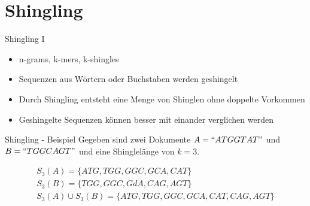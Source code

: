 \section{Shingling}

\begin{frame}{Shingling I}
    \begin{itemize}
        \item n-grams, k-mers, k-shingles
        \item Sequenzen aus Wörtern oder Buchstaben werden geshingelt
        \item Durch Shingling entsteht eine Menge von Shinglen ohne doppelte Vorkommen
        \item Geshingelte Sequenzen können besser mit einander verglichen werden
    \end{itemize}
\end{frame}


\begin{frame}{Shingling - Beispiel}
    Gegeben sind zwei Dokumente $ A = ``ATGGTAT" $ und $ B = ``TGGCAGT" $ und eine Shinglelänge von $ k = 3 $.
    
    \begin{example}
        \begin{equation*}
            \begin{split}
                S_3(A) = \{ATG, TGG, GGC, GCA, CAT\} \\
                S_3(B) = \{TGG, GGC, GdA, CAG, AGT\} \\
                S_3(A) \cup S_3(B) = \{ATG, TGG, GGC, GCA, CAT, CAG, AGT\}
            \end{split}
        \end{equation*}
    \end{example}
\end{frame}
